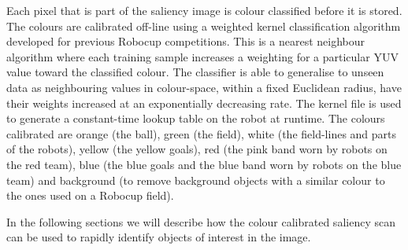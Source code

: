 \documentclass[runningheads,a4paper]{llncs}
\begin{document}
Each pixel that is part of the saliency image is colour classified before it is stored. The colours
are calibrated off-line using a weighted kernel classification algorithm
developed for previous Robocup competitions.\cite{kimcuongpham} This is a
nearest neighbour algorithm where each training sample increases a weighting for
a particular YUV value toward the classified colour. The classifier is able to
generalise to unseen data as neighbouring values in colour-space, within a fixed
Euclidean radius, have their weights increased at an exponentially decreasing
rate. The kernel file is used to generate a constant-time lookup table on the
robot at runtime. The colours calibrated are orange (the ball), green (the
field), white (the field-lines and parts of the robots), yellow (the yellow
goals), red (the pink band worn by robots on the red team), blue (the blue
goals and the blue band worn by robots on the blue team) and background (to remove background objects with a similar colour to the ones used on a Robocup field).



In the following sections we will describe how the colour calibrated saliency scan can be used to rapidly identify objects of interest in the image. 
\end{document}
